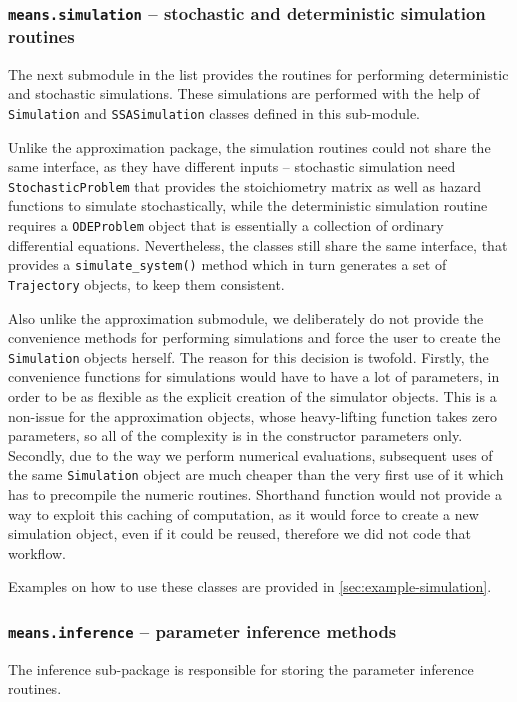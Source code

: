 \subsubsection{{\tt means.simulation} -- stochastic and deterministic simulation routines}

The next submodule in the list provides the routines for performing deterministic and stochastic simulations. These simulations are performed with the help of \verb"Simulation" and \verb"SSASimulation" classes defined in this sub-module.

Unlike the approximation package, the simulation routines could not share the same interface, as they have different inputs -- stochastic simulation need \verb"StochasticProblem" that provides the stoichiometry matrix as well as hazard functions to simulate stochastically, while the deterministic simulation routine requires a \verb"ODEProblem" object that is essentially a collection of ordinary differential equations.
Nevertheless, the classes still share the same interface, that provides a \verb"simulate_system()" method which in turn generates a set of \verb"Trajectory" objects, to keep them consistent.

Also unlike the approximation submodule, we deliberately do not provide the convenience methods for performing simulations and force the user to create the \verb"Simulation" objects herself. 
The reason for this decision is twofold. 
Firstly, the convenience functions for simulations would have to have a lot of parameters, in order to be as flexible as the explicit creation of the simulator objects. 
This is a non-issue for the approximation objects, whose heavy-lifting function takes zero parameters, so all of the complexity is in the constructor parameters only.
Secondly, due to the way we perform numerical evaluations, subsequent uses of the same \verb"Simulation" object are much cheaper than the very first use of it which has to precompile the numeric routines. 
Shorthand function would not provide a way to exploit this caching of computation, as it would force to create a new simulation object, even if it could be reused, therefore we did not code that workflow.

Examples on how to use these classes are provided in \autoref{sec:example-simulation}.

\subsubsection{{\tt means.inference} -- parameter inference methods}
The inference sub-package is responsible for storing the parameter inference routines. 

